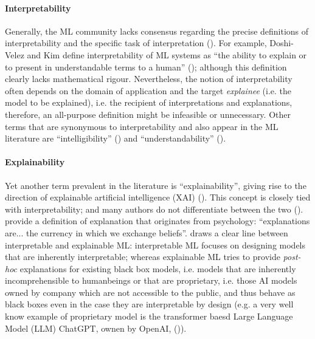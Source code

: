 \documentclass[binding=0.6cm]{sapthesis}
\newcommand{\mycite}[1]{(\cite{#1})}
\begin{document}
\paragraph{Interpretability}
\label{sec:bg.xai.interpretable}
Generally, the ML community lacks consensus regarding the precise definitions of interpretability and the specific task of interpretation \mycite{doshivelez2017-rigorous}. For example, Doshi-Velez and Kim define interpretability of ML systems as “the ability to explain or to present in understandable terms to a human” \mycite{lipton2017-mythos}; although this definition clearly lacks mathematical rigour. Nevertheless, the notion of interpretability often depends on the domain of application and the target \textit{explainee} (i.e. the model to be explained), i.e. the recipient of interpretations and explanations, therefore, an all-purpose definition might be infeasible or unnecessary. Other terms that are synonymous to interpretability and also appear in the ML literature are “intelligibility” \mycite{vilone2021-xai-notions,caruana2015-xai-heatlhcare} and “understandability” \mycite{lipton2017-mythos}. 

\paragraph{Explainability}
\label{sec:bg.xai.explainable}
Yet another term prevalent in the literature is “explainability”, giving rise to the direction of explainable artificial intelligence (XAI) \mycite{turek2021-darpa}. This concept is closely tied with interpretability; and many authors do not differentiate between the two \mycite{carvalho2019-interpr}. \cite{doshivelez2017-rigorous} provide a definition of explanation that originates from psychology: “explanations are... the currency in which we exchange beliefs”. \cite{rudin2019-stop-epxlaining-black-box} draws a clear line between interpretable and explainable ML: interpretable ML focuses on designing models that are inherently interpretable; whereas explainable ML tries to provide \textit{post-hoc} explanations for existing black box models, i.e. models that are inherently incomprehensible to humanbeings or that are proprietary, i.e. those AI models owned by company which are not accessible to the public, and thus behave as black boxes even in the case they are interpretable by design (e.g. a very well know example of proprietary model is the transformer baesd Large Language Model (LLM) ChatGPT, ownen by OpenAI, \mycite{brown2020-gpt3}). 
\end{document}

